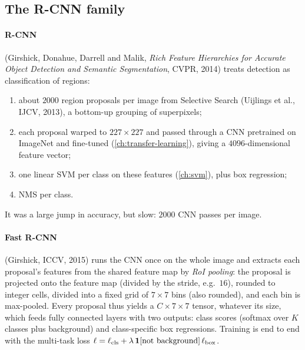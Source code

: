 \begin{notechapter}
\section{The R-CNN family}\label{detection-segmentation:sec:rcnn}

\paragraph{R-CNN} (Girshick, Donahue, Darrell and Malik, \emph{Rich Feature Hierarchies for
Accurate Object Detection and Semantic Segmentation}, CVPR, 2014) treats detection as
classification of regions:
\begin{enumerate}[nosep]
  \item about $2000$ region proposals per image from Selective Search (Uijlings et al., IJCV, 2013),
        a bottom-up grouping of superpixels;
  \item each proposal warped to $227\times227$ and passed through a CNN pretrained on ImageNet and
        fine-tuned (\cref{ch:transfer-learning}), giving a $4096$-dimensional feature vector;
  \item one linear SVM per class on these features (\cref{ch:svm}), plus box regression;
  \item NMS per class.
\end{enumerate}
It was a large jump in accuracy, but slow: $2000$ CNN passes per image.

\paragraph{Fast R-CNN} (Girshick, ICCV, 2015) runs the CNN once on the whole image and
extracts each proposal's features from the shared feature map by \emph{RoI pooling}: the
proposal is projected onto the feature map (divided by the stride, e.g.\ $16$), rounded to
integer cells, divided into a fixed grid of $7\times7$ bins (also rounded), and each bin is max-pooled.
Every proposal thus yields a $C\times7\times7$ tensor, whatever its size, which feeds fully connected
layers with two outputs: class scores (softmax over $K$ classes plus background) and
class-specific box regressions. Training is end to end with the multi-task loss
$\ell = \ell_{\mathrm{cls}} + \lambda\,\mathbf{1}[\text{not background}]\,\ell_{\mathrm{box}}$.


\end{notechapter}
